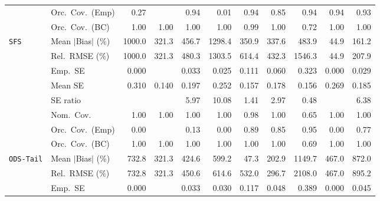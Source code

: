 \begin{landscape}
\begin{longtable}{llrrrrrrrrr}
 & Orc.\ Cov.\ (Emp) & 0.27 &  & \cellcolor{rankone}0.94 & 0.01 & \cellcolor{rankone}0.94 & \cellcolor{rankthree}0.85 & \cellcolor{rankone}0.94 & \cellcolor{rankone}0.94 & \cellcolor{ranktwo}0.93 \\
 & Orc.\ Cov.\ (BC) & \cellcolor{ranktwo}1.00 & \cellcolor{ranktwo}1.00 & \cellcolor{ranktwo}1.00 & \cellcolor{ranktwo}1.00 & \cellcolor{rankone}0.99 & \cellcolor{ranktwo}1.00 & \cellcolor{rankthree}0.72 & \cellcolor{ranktwo}1.00 & \cellcolor{ranktwo}1.00 \\
\addlinespace[2pt]
\quad \texttt{SFS} & Mean $|$Bias$|$ (\%) & 1000.0 & \cellcolor{rankthree}321.3 & 456.7 & 1298.4 & 350.9 & 337.6 & 483.9 & \cellcolor{rankone}44.9 & \cellcolor{ranktwo}161.2 \\
 & Rel.\ RMSE (\%) & 1000.0 & \cellcolor{rankthree}321.3 & 480.3 & 1303.5 & 614.4 & 432.3 & 1546.3 & \cellcolor{rankone}44.9 & \cellcolor{ranktwo}207.9 \\
 & Emp.\ SE & 0.000 &  & 0.033 & 0.025 & 0.111 & 0.060 & 0.323 & 0.000 & 0.029 \\
 & Mean SE & 0.310 & 0.140 & 0.197 & 0.252 & 0.157 & 0.178 & 0.156 & 0.269 & 0.185 \\
 & SE ratio &  &  & 5.97 & 10.08 & \cellcolor{rankone}1.41 & \cellcolor{rankthree}2.97 & \cellcolor{ranktwo}0.48 &  & 6.38 \\
 & Nom.\ Cov. & \cellcolor{ranktwo}1.00 & \cellcolor{ranktwo}1.00 & \cellcolor{ranktwo}1.00 & \cellcolor{ranktwo}1.00 & \cellcolor{rankone}0.98 & \cellcolor{ranktwo}1.00 & \cellcolor{rankthree}0.65 & \cellcolor{ranktwo}1.00 & \cellcolor{ranktwo}1.00 \\
 & Orc.\ Cov.\ (Emp) & 0.00 &  & 0.13 & 0.00 & \cellcolor{ranktwo}0.89 & \cellcolor{rankthree}0.85 & \cellcolor{rankone}0.95 & 0.00 & 0.77 \\
 & Orc.\ Cov.\ (BC) & \cellcolor{rankone}1.00 & \cellcolor{rankone}1.00 & \cellcolor{rankone}1.00 & \cellcolor{rankone}1.00 & \cellcolor{rankone}1.00 & \cellcolor{rankone}1.00 & \cellcolor{ranktwo}0.69 & \cellcolor{rankone}1.00 & \cellcolor{rankone}1.00 \\
\addlinespace[2pt]
\quad \texttt{ODS-Tail} & Mean $|$Bias$|$ (\%) & 732.8 & \cellcolor{rankthree}321.3 & 424.6 & 599.2 & \cellcolor{rankone}47.3 & \cellcolor{ranktwo}202.9 & 1149.7 & 467.0 & 872.0 \\
 & Rel.\ RMSE (\%) & 732.8 & \cellcolor{ranktwo}321.3 & \cellcolor{rankthree}450.6 & 614.6 & 532.0 & \cellcolor{rankone}296.7 & 2108.0 & 467.0 & 895.2 \\
 & Emp.\ SE & 0.000 &  & 0.033 & 0.030 & 0.117 & 0.048 & 0.389 & 0.000 & 0.045 \\

\end{longtable}
\end{landscape}
